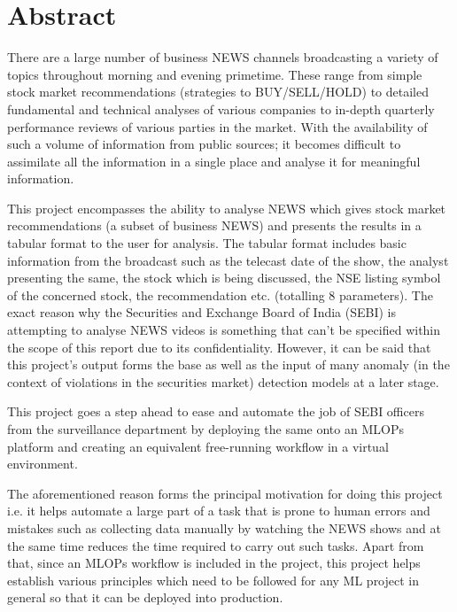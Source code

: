 \chapter*{Abstract}

There are a large number of business NEWS channels broadcasting a
variety of topics throughout morning and evening primetime. These
range from simple stock market recommendations (strategies to
BUY/SELL/HOLD) to detailed fundamental and technical analyses of
various companies to in-depth quarterly performance reviews of
various parties in the market. With the availability of such a volume
of information from public sources; it becomes difficult to
assimilate all the information in a single place and analyse it for
meaningful information. \par

This project encompasses the ability to analyse NEWS which gives
stock market recommendations (a subset of business NEWS) and presents
the results in a tabular format to the user for analysis. The tabular
format includes basic information from the broadcast such as the
telecast date of the show, the analyst presenting the same, the stock
which is being discussed, the NSE listing symbol of the concerned
stock, the recommendation etc. (totalling 8 parameters). The exact
reason why the Securities and Exchange Board of India (SEBI) is
attempting to analyse NEWS videos is something that can’t be
specified within the scope of this report due to its confidentiality.
However, it can be said that this project’s output forms the base as
well as the input of many anomaly (in the context of violations in
the securities market) detection models at a later stage. \par

This project goes a step ahead to ease and automate the job of SEBI
officers from the surveillance department by deploying the same onto
an MLOPs platform and creating an equivalent free-running workflow in
a virtual environment. \par

The aforementioned reason forms the principal motivation for doing
this project i.e. it helps automate a large part of a task that is
prone to human errors and mistakes such as collecting data manually
by watching the NEWS shows and at the same time reduces the time
required to carry out such tasks. Apart from that, since an MLOPs
workflow is included in the project, this project helps establish
various principles which need to be followed for any ML project in
general so that it can be deployed into production.
